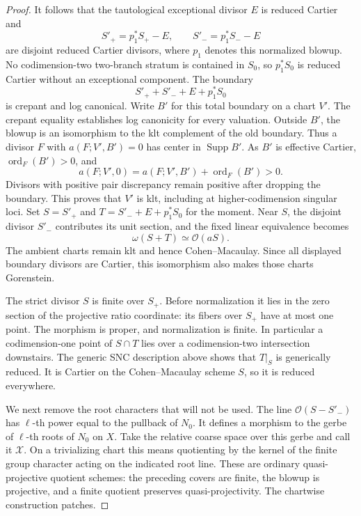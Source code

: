 \documentclass[11pt,letterpaper]{article}
\theoremstyle{definition}
\theoremstyle{remark}
\begin{document}
\begin{proof}
It follows that the tautological exceptional divisor $E$ is
reduced Cartier and
\[
 S'_+=p_1^*S_+-E,\qquad S'_-=p_1^*S_--E
\]
are disjoint reduced Cartier divisors, where $p_1$ denotes this
normalized blowup.  No codimension-two two-branch stratum is
contained in $S_0$, so $p_1^*S_0$ is reduced Cartier without an
exceptional component.  The boundary
\[
 S'_++S'_-+E+p_1^*S_0
\]
is crepant and log canonical.  Write $B'$ for this total
boundary on a chart $V'$.  The crepant equality establishes
log canonicity for every valuation.  Outside $B'$, the
blowup is an isomorphism to the klt complement of the old
boundary.  Thus a divisor $F$ with
$a(F;V',B')=0$ has center in $\operatorname{Supp} B'$.  As $B'$ is
effective Cartier, $\operatorname{ord}_F(B')>0$, and
\[
 a(F;V',0)=a(F;V',B')+\operatorname{ord}_F(B')>0.
\]
Divisors with positive pair discrepancy remain positive
after dropping the boundary.  This proves that $V'$ is
klt, including at higher-codimension singular loci.  Set
$S=S'_+$ and $T=S'_-+E+p_1^*S_0$ for the moment.
Near $S$, the disjoint divisor $S'_-$ contributes its unit
section, and the fixed linear equivalence becomes
\[
 \omega(S+T)\simeq\mathcal{O}(aS).
\]
The ambient charts remain klt and hence Cohen--Macaulay.
Since all displayed boundary divisors are Cartier, this
isomorphism also makes those charts Gorenstein.

The strict divisor $S$ is finite over $S_+$.
Before normalization it lies in the zero section of the
projective ratio coordinate: its fibers over $S_+$ have at
most one point.  The morphism is proper, and normalization is
finite.  In particular a codimension-one point of $S\cap T$
lies over a codimension-two intersection downstairs.  The
generic SNC description above shows that $T|_S$ is generically
reduced.  It is Cartier on the Cohen--Macaulay scheme $S$,
so it is reduced everywhere.

We next remove the root characters that will not be used.
The line $\mathcal{O}(S-S'_-)$ has $\ell$-th power equal to the pullback
of $N_0$.  It defines a morphism to the gerbe of $\ell$-th roots
of $N_0$ on $X$.  Take the relative coarse space over this
gerbe and call it $\mathcal X$.  On a trivializing chart this
means quotienting by the kernel of the finite group character
acting on the indicated root line.  These are ordinary
quasi-projective quotient schemes: the preceding covers are
finite, the blowup is projective, and a finite quotient preserves
quasi-projectivity.  The chartwise construction patches.


\end{proof}
\end{document}
